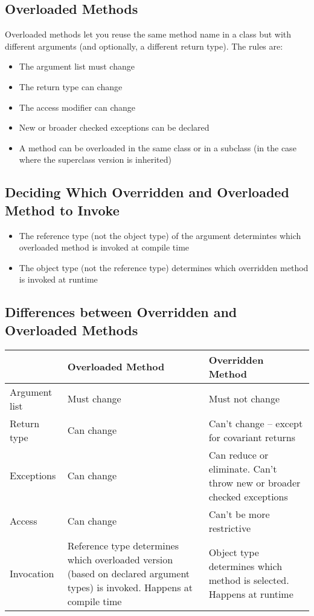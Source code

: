 \subsection{Overloaded Methods}
Overloaded methods let you reuse the same method name in a class but with 
different arguments (and optionally, a different return type). The rules are:
\begin{itemize}
    \item The argument list must change
    \item The return type can change
    \item The access modifier can change
    \item New or broader checked exceptions can be declared
    \item A method can be overloaded in the same class or in a subclass (in the 
    case where the superclass version is inherited)
\end{itemize}

\subsection{Deciding Which Overridden and Overloaded Method to Invoke}
\begin{itemize}
    \item The reference type (not the object type) of the argument determintes 
    which overloaded method is invoked at compile time
    \item The object type (not the reference type) determines which overridden 
    method is invoked at runtime
\end{itemize}

\subsection{Differences between Overridden and Overloaded Methods}
\begin{center}
\begin{tabular}{lp{6cm}p{6cm}}
    & \textbf{Overloaded Method} & \textbf{Overridden Method} \\
    \hline
    Argument list & Must change & Must not change \\
    \hline
    Return type & Can change & Can't change -- except for covariant returns \\
    \hline
    Exceptions & Can change & Can reduce or eliminate. Can't throw new or 
    broader checked exceptions \\
    \hline
    Access & Can change & Can't be more restrictive \\
    \hline
    Invocation & Reference type determines which overloaded version (based on 
    declared argument types) is invoked. Happens at compile time & Object type 
    determines which method is selected. Happens at runtime \\
\end{tabular}
\end{center}

